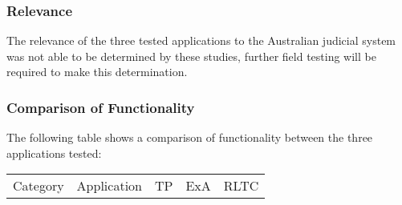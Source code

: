 \subsubsection{Relevance}
The relevance of the three tested applications to the Australian judicial system was not able to be determined by these studies, further field testing will be required to make this determination.
\newpage
\subsubsection{Comparison of Functionality}
The following table shows a comparison of functionality between the three applications tested: 
\singlespace
\begin{center}
\begin{tabular}{|c| c|| c| c| c |} 
\hline
\rowcolor{lightgrey} Category & Application & TP & ExA & RLTC \\ [0.5ex] 


\end{tabular}
\end{center}
